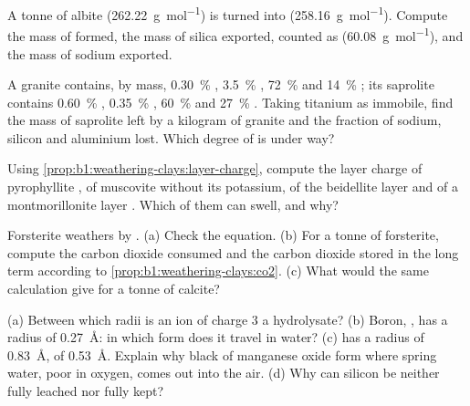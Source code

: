 \begin{exercise}[$\star\star$]\label{exo:b1:weathering-clays:6}
A tonne of albite  (\qty{262.22}{g.mol^{-1}}) is turned into
 (\qty{258.16}{g.mol^{-1}}). Compute the mass of  formed, the
mass of silica exported, counted as  (\qty{60.08}{g.mol^{-1}}), and the
mass of sodium exported.
\end{exercise}

\begin{exercise}[$\star\star$]\label{exo:b1:weathering-clays:7}
A granite contains, by mass, \qty{0.30}{\percent} , \qty{3.5}{\percent}
, \qty{72}{\percent}  and \qty{14}{\percent} ; its
saprolite contains \qty{0.60}{\percent} , \qty{0.35}{\percent}
, \qty{60}{\percent}  and \qty{27}{\percent} .
Taking titanium as immobile, find the mass of saprolite left by a kilogram of
granite and the fraction of sodium, silicon and aluminium lost. Which degree of
 is under way?
\end{exercise}

\begin{exercise}[$\star\star$]\label{exo:b1:weathering-clays:8}
Using \cref{prop:b1:weathering-clays:layer-charge}, compute the layer charge of
pyrophyllite , of muscovite  without
its potassium, of the beidellite layer  and of
a montmorillonite layer . Which of them can
swell, and why?
\end{exercise}

\begin{exercise}[$\star\star$]\label{exo:b1:weathering-clays:9}
Forsterite  weathers by
. (a) Check the
equation. (b) For a tonne of forsterite, compute the carbon dioxide consumed and
the carbon dioxide stored in the long term according to
\cref{prop:b1:weathering-clays:co2}. (c) What would the same calculation give
for a tonne of calcite?
\end{exercise}

\begin{exercise}[$\star\star\star$]\label{exo:b1:weathering-clays:10}
(a) Between which radii is an ion of charge 3 a hydrolysate? (b) Boron,
, has a radius of \qty{0.27}{\angstrom}: in which form does it travel
in water? (c)  has a radius of \qty{0.83}{\angstrom},  of
\qty{0.53}{\angstrom}. Explain why black  of manganese oxide form where
spring water, poor in oxygen, comes out into the air. (d) Why can silicon be
neither fully leached nor fully kept?
\end{exercise}

